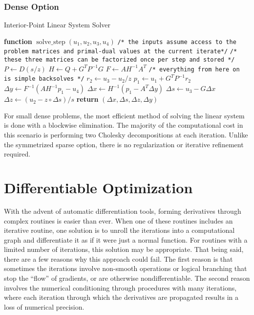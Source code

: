 \subsubsection{Dense Option}
%
\begin{algorithm}
\caption{Interior-Point Linear System Solver}\label{pdip_step_solve}
\begin{algorithmic}[1]
\State \textbf{function} $\operatorname{solve\_step}(u_1, u_2, u_3, u_4)$ %
\State \texttt{/* the inputs assume access to the problem matrices and primal-dual values at the current iterate*/}
\State 
\State \texttt{/* these three matrices can be factorized once per step and stored */}
\State $P \gets D(s / z)$ 
\State $H \gets Q + G^TP^{-1}G$ 
\State $F \gets A H^{-1} A^T$  
\State 
\State \texttt{/* everything from here on is simple backsolves */}
\State $r_2 \gets u_3 - u_2 / z$ 
\State $p_1 \gets u_1 + G^T P^{-1}r_2$ 
\State $\Delta y \gets F^{-1}(A H^{-1}p_1 - u_4)$
\State $\Delta x \gets H^{-1}(p_1 - A^T\Delta y)$ 
\State $\Delta s \gets u_3 - G \Delta x$ 
\State $\Delta z \gets (u_2 - z \circ \Delta s) / s$
\State \textbf{return} $(\Delta x, \Delta s, \Delta z, \Delta y)$
\end{algorithmic}
\end{algorithm}
For small dense problems, the most efficient method of solving the linear system is done with a blockwise elimination. The majority of the computational cost in this scenario is performing two Cholesky decompositions at each iteration. Unlike the symmetrized sparse option, there is no regularization or iterative refinement required.
%
%
\section{Differentiable Optimization}
%
%
With the advent of automatic differentiation tools, forming derivatives through complex routines is easier than ever. When one of these routines includes an iterative routine, one solution is to unroll the iterations into a computational graph and differentiate it as if it were just a normal function. For routines with a limited number of iterations, this solution may be appropriate. That being said, there are a few reasons why this approach could fail. The first reason is that sometimes the iterations involve non-smooth operations or logical branching that stop the ``flow'' of gradients, or are otherwise nondifferentiable. The second reason involves the numerical conditioning through procedures with many iterations, where each iteration through which the derivatives are propagated results in a loss of numerical precision. 
%
%
